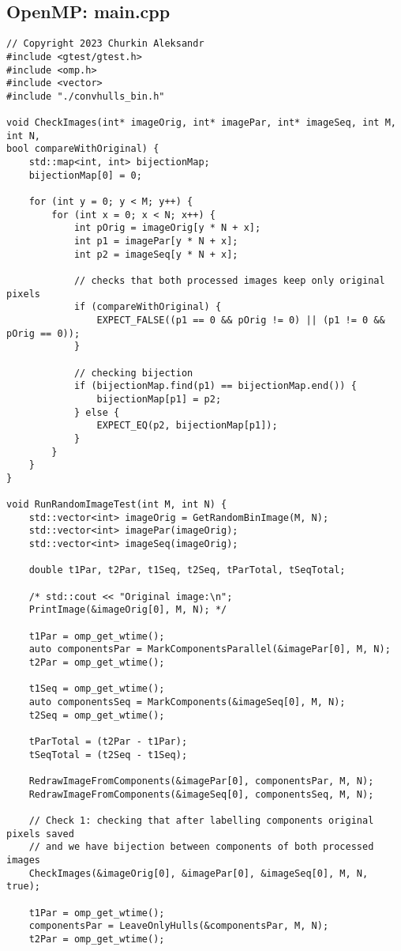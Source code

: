 \documentclass[14pt, russian]{extarticle}
\begin{document}
	\subsection{OpenMP: main.cpp}
	\begin{lstlisting}
// Copyright 2023 Churkin Aleksandr
#include <gtest/gtest.h>
#include <omp.h>
#include <vector>
#include "./convhulls_bin.h"

void CheckImages(int* imageOrig, int* imagePar, int* imageSeq, int M, int N,
bool compareWithOriginal) {
	std::map<int, int> bijectionMap;
	bijectionMap[0] = 0;
	
	for (int y = 0; y < M; y++) {
		for (int x = 0; x < N; x++) {
			int pOrig = imageOrig[y * N + x];
			int p1 = imagePar[y * N + x];
			int p2 = imageSeq[y * N + x];
			
			// checks that both processed images keep only original pixels
			if (compareWithOriginal) {
				EXPECT_FALSE((p1 == 0 && pOrig != 0) || (p1 != 0 && pOrig == 0));
			}
			
			// checking bijection
			if (bijectionMap.find(p1) == bijectionMap.end()) {
				bijectionMap[p1] = p2;
			} else {
				EXPECT_EQ(p2, bijectionMap[p1]);
			}
		}
	}
}

void RunRandomImageTest(int M, int N) {
	std::vector<int> imageOrig = GetRandomBinImage(M, N);
	std::vector<int> imagePar(imageOrig);
	std::vector<int> imageSeq(imageOrig);
	
	double t1Par, t2Par, t1Seq, t2Seq, tParTotal, tSeqTotal;
	
	/* std::cout << "Original image:\n";
	PrintImage(&imageOrig[0], M, N); */
	
	t1Par = omp_get_wtime();
	auto componentsPar = MarkComponentsParallel(&imagePar[0], M, N);
	t2Par = omp_get_wtime();
	
	t1Seq = omp_get_wtime();
	auto componentsSeq = MarkComponents(&imageSeq[0], M, N);
	t2Seq = omp_get_wtime();
	
	tParTotal = (t2Par - t1Par);
	tSeqTotal = (t2Seq - t1Seq);
	
	RedrawImageFromComponents(&imagePar[0], componentsPar, M, N);
	RedrawImageFromComponents(&imageSeq[0], componentsSeq, M, N);
	
	// Check 1: checking that after labelling components original pixels saved
	// and we have bijection between components of both processed images
	CheckImages(&imageOrig[0], &imagePar[0], &imageSeq[0], M, N, true);
	
	t1Par = omp_get_wtime();
	componentsPar = LeaveOnlyHulls(&componentsPar, M, N);
	t2Par = omp_get_wtime();
	

\end{lstlisting}
\end{document}
